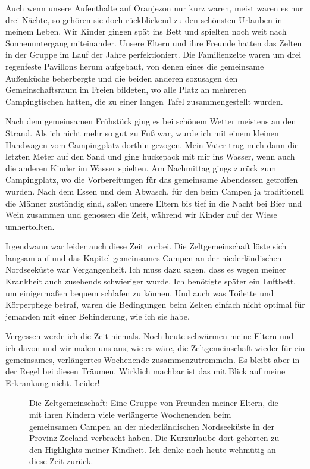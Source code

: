 \documentclass[fontsize=14pt,a4paper,headinclude,DIV=calc,automark]{scrbook}
\begin{document}
Auch wenn unsere Aufenthalte auf Oranjezon nur kurz waren, meist waren es nur drei Nächte, so gehören sie doch rückblickend zu den schönsten Urlauben in meinem Leben. Wir Kinder gingen spät ins Bett und spielten noch weit nach Sonnenuntergang miteinander. Unsere Eltern und ihre Freunde hatten das Zelten in der Gruppe im Lauf der Jahre perfektioniert. Die Familienzelte waren um drei regenfeste Pavillons herum aufgebaut, von denen eines die gemeinsame Außenküche beherbergte und die beiden anderen sozusagen den Gemeinschaftsraum im Freien bildeten, wo alle Platz an mehreren Campingtischen hatten, die zu einer langen Tafel zusammengestellt wurden.

Nach dem gemeinsamen Frühstück ging es bei schönem Wetter meistens an den Strand. Als ich nicht mehr so gut zu Fuß war, wurde ich mit einem kleinen Handwagen vom Campingplatz dorthin gezogen. Mein Vater trug mich dann die letzten Meter auf den Sand und ging huckepack mit mir ins Wasser, wenn auch die anderen Kinder im Wasser spielten. Am Nachmittag gings zurück zum Campingplatz, wo die Vorbereitungen für das gemeinsame Abendessen getroffen wurden. Nach dem Essen und dem Abwasch, für den beim Campen ja traditionell die Männer zuständig sind, saßen unsere Eltern bis tief in die Nacht bei Bier und Wein zusammen und genossen die Zeit, während wir Kinder auf der Wiese umhertollten.

Irgendwann war leider auch diese Zeit vorbei. Die Zeltgemeinschaft löste sich langsam auf und das Kapitel gemeinsames Campen an der niederländischen Nordseeküste war Vergangenheit. Ich muss dazu sagen, dass es wegen meiner Krankheit auch zusehends schwieriger wurde. Ich benötigte später ein Luftbett, um einigermaßen bequem schlafen zu können. Und auch was Toilette und Körperpflege betraf, waren die Bedingungen beim Zelten einfach nicht optimal für jemanden mit einer Behinderung, wie ich sie habe.

Vergessen werde ich die Zeit niemals. Noch heute schwärmen meine Eltern und ich davon und wir malen uns aus, wie es wäre, die Zeltgemeinschaft wieder für ein gemeinsames, verlängertes Wochenende zusammenzutrommeln. Es bleibt aber in der Regel bei diesen Träumen. Wirklich machbar ist das mit Blick auf meine Erkrankung nicht. Leider!

\setlength{\fboxsep}{0pt}    %
\setlength{\fboxrule}{0.2pt} %
\begin{figure}[H]
    \raggedright
    \caption{Die Zeltgemeinschaft: Eine Gruppe von Freunden meiner Eltern, die mit ihren Kindern viele verlängerte Wochenenden beim gemeinsamen Campen an der niederländischen Nordseeküste in der Provinz Zeeland verbracht haben. Die Kurzurlaube dort gehörten zu den Highlights meiner Kindheit. Ich denke noch heute wehmütig an diese Zeit zurück.}
    \label{fig:zeltgemeinschaftcollection}
\end{figure}
\end{document}
